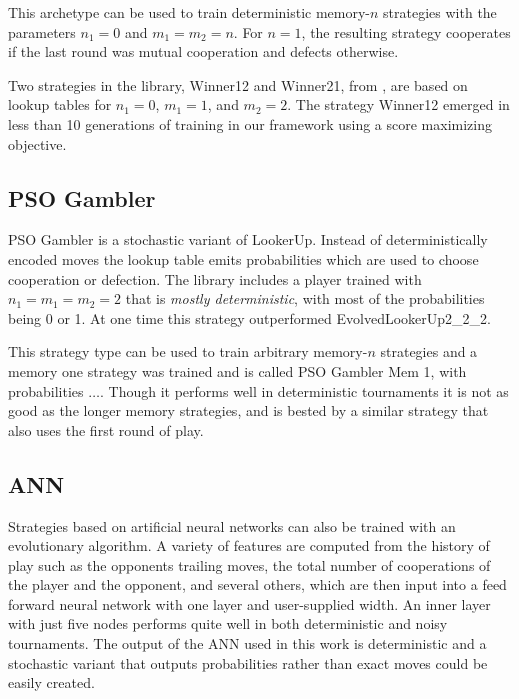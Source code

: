 \documentclass{article}
\begin{document}
This archetype can be used to train deterministic memory-$n$ strategies with the
parameters $n_1=0$ and $m_1=m_2=n$. For $n=1$, the resulting strategy cooperates
if the last round was mutual cooperation and defects otherwise.

Two strategies in the library, Winner12 and Winner21, from \cite{Mathieu2015},
are based on lookup tables for $n_1 = 0$, $m_1 = 1$, and $m_2=2$. The strategy
Winner12 emerged in less than 10 generations of training in our framework using
a score maximizing objective.

\subsection{PSO Gambler}

PSO Gambler is a stochastic variant of LookerUp. Instead of deterministically
encoded moves the lookup table emits probabilities which are
used to choose cooperation or defection. The library includes a player trained
with $n_1 = m_1 = m_2 = 2$ that is \emph{mostly deterministic}, with most of the
probabilities being 0 or 1. At one time this strategy outperformed
EvolvedLookerUp2_2_2.

This strategy type can be used to train arbitrary memory-$n$ strategies and a
memory one strategy was trained and is called PSO Gambler Mem 1, with
probabilities $\ldots$. Though it performs well in deterministic tournaments
it is not as good as the longer memory strategies, and is bested by a similar
strategy that also uses the first round of play.


\subsection{ANN}

Strategies based on artificial neural networks can also be trained with an
evolutionary algorithm. A variety of features are computed from the history
of play such as the opponents trailing moves, the total number of cooperations
of the player and the opponent, and several others, which are then input
into a feed forward neural network with one layer and user-supplied width.
An inner layer with just five nodes performs quite well in both deterministic and
noisy tournaments. The output of the ANN used in this work is deterministic and
a stochastic variant that outputs probabilities rather than exact moves could
be easily created.
\end{document}
